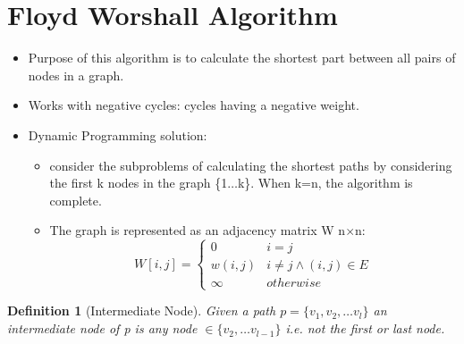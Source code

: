 \documentclass[12pt,letterpaper]{article}
\newtheorem{definition}{Definition}[section]
\begin{document}
\section{Floyd Worshall Algorithm}
\begin{itemize}
\item Purpose of this algorithm is to calculate the shortest part between all pairs of nodes in a graph. 
\item Works with negative cycles: cycles having a negative weight.
\item Dynamic Programming solution:
\begin{itemize}
\item consider the subproblems of calculating the shortest paths by considering the first k nodes in the graph \{1$\dots$k\}. When k=n, the algorithm is complete. 
\item The graph is represented as an adjacency matrix W n$\times$n:
\[W[i,j]=\begin{cases}0 & i=j\\ w(i,j) & i\neq j \wedge (i,j)\in E \\ \infty & otherwise \end{cases}\]
\end{itemize}
\end{itemize}
\begin{definition}[Intermediate Node]\hfill \break
Given a path $p=\{v_1,v_2,\dots v_l\}$ an intermediate node of p is any node $\in \{v_2,\dots v_{l-1}\}$ i.e. not the first or last node. 
\end{definition}
\end{document}

